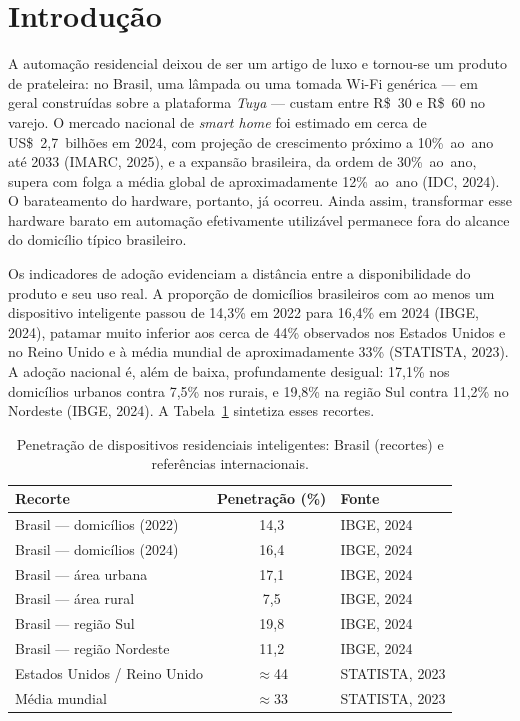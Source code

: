\section{Introdução}\label{cap:intro}

A automação residencial deixou de ser um artigo de luxo e tornou-se um produto de
prateleira: no Brasil, uma lâmpada ou uma tomada Wi-Fi genérica --- em geral
construídas sobre a plataforma \textit{Tuya} --- custam entre R\$~30 e R\$~60 no
varejo. O mercado nacional de \textit{smart home} foi estimado em cerca de
US\$~2,7~bilhões em 2024, com projeção de crescimento próximo a 10\%~ao~ano até 2033
(IMARC, 2025), e a expansão brasileira, da ordem de 30\%~ao~ano, supera com folga a
média global de aproximadamente 12\%~ao~ano (IDC, 2024). O barateamento do hardware,
portanto, já ocorreu. Ainda assim, transformar esse hardware barato em automação
efetivamente utilizável permanece fora do alcance do domicílio típico brasileiro.

Os indicadores de adoção evidenciam a distância entre a disponibilidade do produto e
seu uso real. A proporção de domicílios brasileiros com ao menos um dispositivo
inteligente passou de 14,3\% em 2022 para 16,4\% em 2024 (IBGE, 2024), patamar muito
inferior aos cerca de 44\% observados nos Estados Unidos e no Reino Unido e à média
mundial de aproximadamente 33\% (STATISTA, 2023). A adoção nacional é, além de baixa,
profundamente desigual: 17,1\% nos domicílios urbanos contra 7,5\% nos rurais, e
19,8\% na região Sul contra 11,2\% no Nordeste (IBGE, 2024). A
Tabela~\ref{tab:penetracao} sintetiza esses recortes.

\begin{table}[H]
\centering
\caption{Penetração de dispositivos residenciais inteligentes: Brasil (recortes) e
referências internacionais.}
\label{tab:penetracao}
\begin{tabular}{@{}lcl@{}}
\toprule
\textbf{Recorte} & \textbf{Penetração (\%)} & \textbf{Fonte} \\
\midrule
Brasil --- domicílios (2022)     & 14,3        & IBGE, 2024 \\
Brasil --- domicílios (2024)     & 16,4        & IBGE, 2024 \\
Brasil --- área urbana           & 17,1        & IBGE, 2024 \\
Brasil --- área rural            & 7,5         & IBGE, 2024 \\
Brasil --- região Sul            & 19,8        & IBGE, 2024 \\
Brasil --- região Nordeste       & 11,2        & IBGE, 2024 \\
Estados Unidos / Reino Unido     & $\approx$44 & STATISTA, 2023 \\
Média mundial                    & $\approx$33 & STATISTA, 2023 \\
\bottomrule
\end{tabular}
\end{table}

